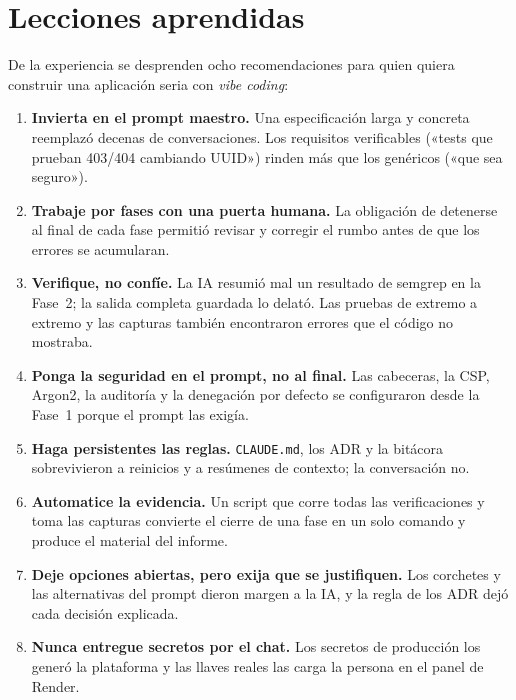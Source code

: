 \documentclass[stu,12pt,floatsintext]{apa7}
\newcommand{\ruta}[1]{{\urlstyle{tt}\nolinkurl{#1}}}
\begin{document}
\section{Lecciones aprendidas}

De la experiencia se desprenden ocho recomendaciones para quien quiera construir una aplicación seria
con \textit{vibe coding}:

\begin{enumerate}[leftmargin=0.5in]
  \item \textbf{Invierta en el prompt maestro.} Una especificación larga y concreta reemplazó decenas de
        conversaciones. Los requisitos verificables («tests que prueban 403/404 cambiando UUID») rinden
        más que los genéricos («que sea seguro»).
  \item \textbf{Trabaje por fases con una puerta humana.} La obligación de detenerse al final de cada fase
        permitió revisar y corregir el rumbo antes de que los errores se acumularan.
  \item \textbf{Verifique, no confíe.} La IA resumió mal un resultado de semgrep en la Fase~2; la salida
        completa guardada lo delató. Las pruebas de extremo a extremo y las capturas también encontraron
        errores que el código no mostraba.
  \item \textbf{Ponga la seguridad en el prompt, no al final.} Las cabeceras, la CSP, Argon2, la auditoría
        y la denegación por defecto se configuraron desde la Fase~1 porque el prompt las exigía.
  \item \textbf{Haga persistentes las reglas.} \ruta{CLAUDE.md}, los ADR y la bitácora sobrevivieron a
        reinicios y a resúmenes de contexto; la conversación no.
  \item \textbf{Automatice la evidencia.} Un script que corre todas las verificaciones y toma las capturas
        convierte el cierre de una fase en un solo comando y produce el material del informe.
  \item \textbf{Deje opciones abiertas, pero exija que se justifiquen.} Los corchetes y las alternativas
        del prompt dieron margen a la IA, y la regla de los ADR dejó cada decisión explicada.
  \item \textbf{Nunca entregue secretos por el chat.} Los secretos de producción los generó la plataforma
        y las llaves reales las carga la persona en el panel de Render.
\end{enumerate}
\end{document}
